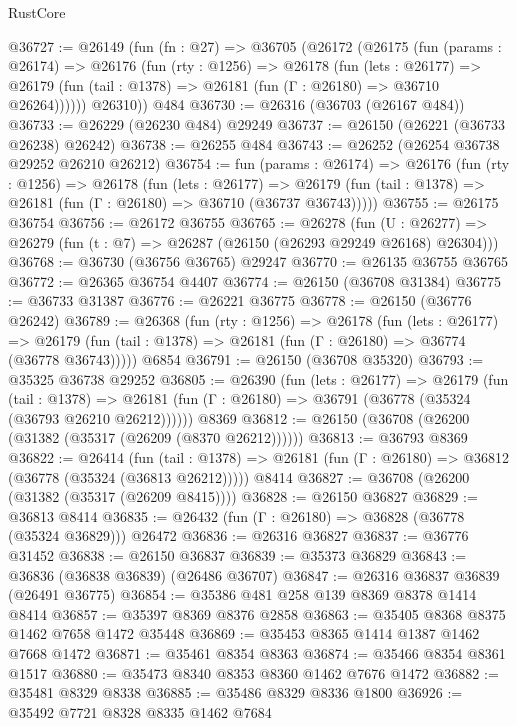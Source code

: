 \begin{lexlean}{RustCore}
\begin{coremodule}
@36727 := @26149
    (fun (fn : @27) =>
    @36705
      (@26172
        (@26175
          (fun (params : @26174) =>
          @26176
            (fun (rty : @1256) =>
            @26178
              (fun (lets : @26177) =>
              @26179 (fun (tail : @1378) => @26181 (fun (Γ : @26180) => @36710 @26264))))))
        @26310))
    @484
@36730 := @26316 (@36703 (@26167 @484))
@36733 := @26229 (@26230 @484) @29249
@36737 := @26150 (@26221 (@36733 @26238) @26242)
@36738 := @26255 @484
@36743 := @26252 (@26254 @36738 @29252 @26210 @26212)
@36754 := fun (params : @26174) =>
  @26176
    (fun (rty : @1256) =>
    @26178
      (fun (lets : @26177) =>
      @26179 (fun (tail : @1378) => @26181 (fun (Γ : @26180) => @36710 (@36737 @36743)))))
@36755 := @26175 @36754
@36756 := @26172 @36755
@36765 := @26278
    (fun (U : @26277) => @26279 (fun (t : @7) => @26287 (@26150 (@26293 @29249 @26168) @26304)))
@36768 := @36730 (@36756 @36765) @29247
@36770 := @26135 @36755 @36765
@36772 := @26365 @36754 @4407
@36774 := @26150 (@36708 @31384)
@36775 := @36733 @31387
@36776 := @26221 @36775
@36778 := @26150 (@36776 @26242)
@36789 := @26368
    (fun (rty : @1256) =>
    @26178
      (fun (lets : @26177) =>
      @26179 (fun (tail : @1378) => @26181 (fun (Γ : @26180) => @36774 (@36778 @36743)))))
    @6854
@36791 := @26150 (@36708 @35320)
@36793 := @35325 @36738 @29252
@36805 := @26390
    (fun (lets : @26177) =>
    @26179
      (fun (tail : @1378) =>
      @26181 (fun (Γ : @26180) => @36791 (@36778 (@35324 (@36793 @26210 @26212))))))
    @8369
@36812 := @26150 (@36708 (@26200 (@31382 (@35317 (@26209 (@8370 @26212))))))
@36813 := @36793 @8369
@36822 := @26414
    (fun (tail : @1378) => @26181 (fun (Γ : @26180) => @36812 (@36778 (@35324 (@36813 @26212)))))
    @8414
@36827 := @36708 (@26200 (@31382 (@35317 (@26209 @8415))))
@36828 := @26150 @36827
@36829 := @36813 @8414
@36835 := @26432 (fun (Γ : @26180) => @36828 (@36778 (@35324 @36829))) @26472
@36836 := @26316 @36827
@36837 := @36776 @31452
@36838 := @26150 @36837
@36839 := @35373 @36829
@36843 := @36836 (@36838 @36839) (@26486 @36707)
@36847 := @26316 @36837 @36839 (@26491 @36775)
@36854 := @35386 @481 @258 @139 @8369 @8378 @1414 @8414
@36857 := @35397 @8369 @8376 @2858
@36863 := @35405 @8368 @8375 @1462 @7658 @1472 @35448
@36869 := @35453 @8365 @1414 @1387 @1462 @7668 @1472
@36871 := @35461 @8354 @8363
@36874 := @35466 @8354 @8361 @1517
@36880 := @35473 @8340 @8353 @8360 @1462 @7676 @1472
@36882 := @35481 @8329 @8338
@36885 := @35486 @8329 @8336 @1800
@36926 := @35492
    @7721
    @8328
    @8335
    @1462
    @7684

\end{coremodule}
\end{lexlean}
